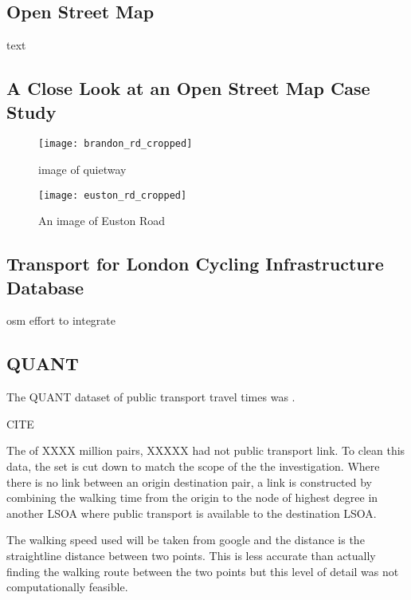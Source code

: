 \subsection{Open Street Map}

text

\cite{osm}

\subsection{A Close Look at an Open Street Map Case Study}

\begin{figure}
\centering
\texttt{[image: brandon\_rd\_cropped]}
\caption{image of quietway}
\end{figure}

\begin{figure}
\centering
\texttt{[image: euston\_rd\_cropped]}
\caption{An image of Euston Road}
\label{fig:euston}
\end{figure}

\subsection{Transport for London Cycling Infrastructure Database}

\cite{tflcid}

osm effort to integrate

\subsection{QUANT}

The QUANT dataset of public transport travel times was .

CITE

The of XXXX million pairs, XXXXX had not public transport link. To clean this data, the set is cut down to match the scope of the the investigation. Where there is no link between an origin destination pair, a link is constructed by combining the walking time from the origin to the node of highest degree in another LSOA where public transport is available to the destination LSOA. 

The walking speed used will be taken from google and the distance is the straightline distance between two points. This is less accurate than actually finding the walking route between the two points but this level of detail was not computationally feasible. 

